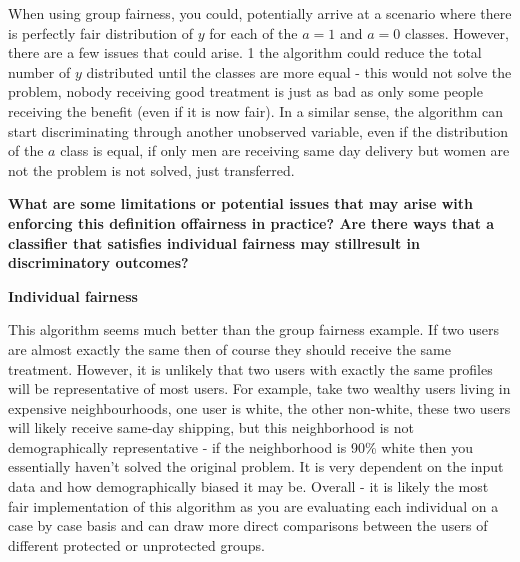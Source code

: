 \documentclass[submit]{harvardml}
\begin{document}
When using group fairness, you could, potentially arrive at a scenario where there is perfectly fair distribution of $y$ for each of the $a=1$ and $a=0$ classes. However, there are a few issues that could arise. 1 the algorithm could reduce the total number of $y$ distributed until the classes are more equal - this would not solve the problem, nobody receiving good treatment is just as bad as only some people receiving the benefit (even if it is now fair). In a similar sense, the algorithm can start discriminating through another unobserved variable, even if the distribution of the $a$ class is equal, if only men are receiving same day delivery but women are not the problem is not solved, just transferred.

\item \textbf{What  are  some  limitations  or  potential  issues  that  may  arise  with  enforcing  this  definition  offairness  in  practice?   Are  there  ways  that  a  classifier  that  satisfies  individual  fairness  may  stillresult in discriminatory outcomes?}

\textbf{Individual fairness}

This algorithm seems much better than the group fairness example. If two users are almost exactly the same then of course they should receive the same treatment. However, it is unlikely that two users with exactly the same profiles will be representative of most users. For example, take two wealthy users living in expensive neighbourhoods, one user is white, the other non-white, these two users will likely receive same-day shipping, but this neighborhood is not demographically representative - if the neighborhood is 90\% white then you essentially haven't solved the original problem. It is very dependent on the input data and how demographically biased it may be. Overall - it is likely the most fair implementation of this algorithm as you are evaluating each individual on a case by case basis and can draw more direct comparisons between the users of different protected or unprotected groups.

\newpage
\end{document}
